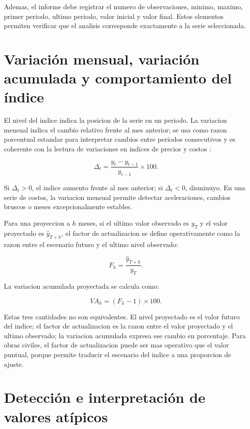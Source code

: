 ﻿\documentclass[12pt,letterpaper]{article}
\newcommand{\yhat}{\hat{y}}
\begin{document}
Ademas, el informe debe registrar el numero de observaciones, minimo, maximo, primer periodo, ultimo periodo, valor inicial y valor final. Estos elementos permiten verificar que el analisis corresponde exactamente a la serie seleccionada.



\section{Variación mensual, variación acumulada y comportamiento del índice}

El nivel del indice indica la posicion de la serie en un periodo. La variacion mensual indica el cambio relativo frente al mes anterior; se usa como razon porcentual estandar para interpretar cambios entre periodos consecutivos y es coherente con la lectura de variaciones en indices de precios y costos \citep{dane2021metodologia}:

\[
\Delta_t = \frac{y_t-y_{t-1}}{y_{t-1}}\times 100.
\]

Si \(\Delta_t>0\), el indice aumento frente al mes anterior; si \(\Delta_t<0\), disminuyo. En una serie de costos, la variacion mensual permite detectar aceleraciones, cambios bruscos o meses excepcionalmente estables.

Para una proyeccion a \(h\) meses, si el ultimo valor observado es \(y_T\) y el valor proyectado es \(\yhat_{T+h}\), el factor de actualizacion se define operativamente como la razon entre el escenario futuro y el ultimo nivel observado:

\[
F_h = \frac{\yhat_{T+h}}{y_T}.
\]

La variacion acumulada proyectada se calcula como:

\[
VA_h = (F_h-1)\times 100.
\]

Estas tres cantidades no son equivalentes. El nivel proyectado es el valor futuro del indice; el factor de actualizacion es la razon entre el valor proyectado y el ultimo observado; la variacion acumulada expresa ese cambio en porcentaje. Para obras civiles, el factor de actualizacion puede ser mas operativo que el valor puntual, porque permite traducir el escenario del indice a una proporcion de ajuste.




\section{Detección e interpretación de valores atípicos}
\end{document}
